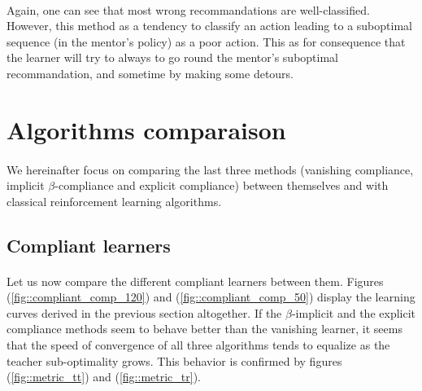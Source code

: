\documentclass[a4paper]{report}
\begin{document}
{{{{			\paragraph{} Again, one can see that most wrong recommandations are well-classified. However, this method as a tendency to classify an action leading to a suboptimal sequence (in the mentor's policy) as a poor action. This as for consequence that the learner will try to always to go round the mentor's suboptimal recommandation, and sometime by making some detours. 
			}
		}
		\section{Algorithms comparaison}
		{
			\label{sec_method_comp}
			\paragraph{} We hereinafter focus on comparing the last three methods (vanishing compliance, implicit $\beta$-compliance and explicit compliance) between themselves and with classical reinforcement learning algorithms. 
			
			\subsection{Compliant learners}
			{
				\paragraph{} Let us now compare the different compliant learners between them. Figures (\ref{fig::compliant_comp_120}) and (\ref{fig::compliant_comp_50}) display the learning curves derived in the previous section altogether. If the $\beta$-implicit and the explicit compliance methods seem to behave better than the vanishing learner, it seems that the speed of convergence of all three algorithms tends to equalize as the teacher sub-optimality grows. This behavior is confirmed by figures (\ref{fig::metric_tt}) and (\ref{fig::metric_tr}). 
				
}}}}
\end{document}
